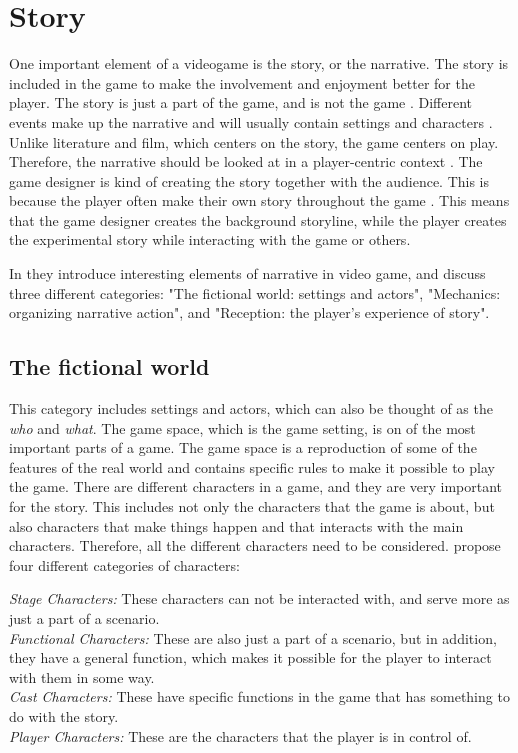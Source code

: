\section{Story}
One important element of a videogame is the story, or the narrative. The story is included in the game to make the involvement and enjoyment better for the player. The story is just a part of the game, and is not the game \cite{umlapproach}.  Different events make up the narrative and will usually contain settings and characters \cite{understandingvg}. Unlike literature and film, which centers on the story, the game centers on play. Therefore, the narrative should be looked at in a player-centric context \cite{gametheory}. The game designer is kind of creating the story together with the audience. This is because the player often make their own story throughout the game \cite{umlapproach}. This means that the game designer creates the background storyline, while the player creates the experimental story while interacting with the game or others. 

In \cite{understandingvg} they introduce interesting elements of narrative in video game, and discuss three different categories: "The fictional world: settings and actors", "Mechanics: organizing narrative action", and "Reception: the player’s experience of story".

\subsection{The fictional world}
This category includes settings and actors, which can also be thought of as the \emph{who} and \emph{what}. The game space, which is the game setting, is on of the most important parts of a game. The game space is a reproduction of some of the features of the real world and contains specific rules to make it possible to play the game. There are different characters in a game, and they are very important for the story. This includes not only the characters that the game is about, but also characters that make things happen and that interacts with the main characters. Therefore, all the different characters need to be considered. \cite{understandingvg} propose four different categories of characters: 

\emph{Stage Characters:} These characters can not be interacted with, and serve more as just a part of a scenario. \\
\emph{Functional Characters:} These are also just a part of a scenario, but in addition, they have a general function, which makes it possible for the player to interact with them in some way. \\
\emph{Cast Characters:} These have specific functions in the game that has something to do with the story. \\
\emph{Player Characters:} These are the characters that the player is in control of. 

